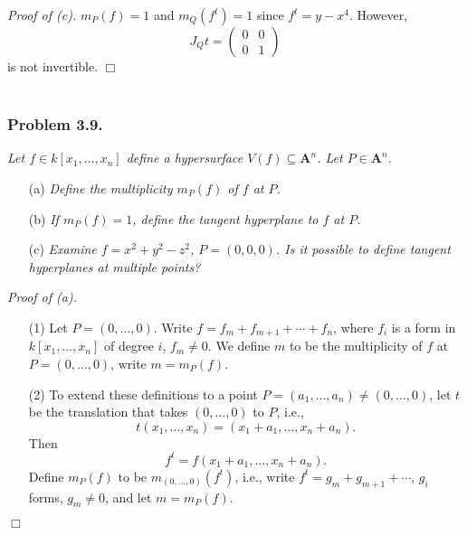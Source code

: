 \documentclass{article}
\begin{document}
\emph{Proof of (c).}
  $m_P(f) = 1$ and $m_Q(f^t) = 1$ since $f^t = y - x^4$.
  However,
  \[
    J_Q{t}
    =
    \begin{pmatrix}
      0 & 0 \\
      0 & 1
    \end{pmatrix}
  \]
  is not invertible.
$\Box$ \\\\






\subsubsection*{Problem 3.9.}
\emph{Let $f \in k[x_1,\ldots,x_n]$ define a hypersurface $V(f) \subseteq \mathbf{A}^{n}$.
Let $P \in \mathbf{A}^{n}$.}
\begin{enumerate}
\item[(a)]
  \emph{Define the multiplicity $m_P(f)$ of $f$ at $P$.}

\item[(b)]
  \emph{If $m_P(f) = 1$, define the tangent hyperplane to $f$ at $P$.}

\item[(c)]
  \emph{Examine $f = x^2 + y^2 - z^2$, $P = (0,0,0)$.
  Is it possible to define tangent hyperplanes at multiple points?} \\
\end{enumerate}



\emph{Proof of (a).}
\begin{enumerate}
\item[(1)]
  Let $P = (0,\ldots,0)$.
  Write $f = f_m + f_{m+1} + \cdots + f_n$,
  where $f_i$ is a form in $k[x_1,\ldots,x_n]$ of degree $i$, $f_m \neq 0$.
  We define $m$ to be the multiplicity of $f$ at $P = (0,\ldots,0)$, write $m = m_P(f)$.

\item[(2)]
  To extend these definitions to a point $P = (a_1,\ldots,a_n) \neq (0,\ldots,0)$,
  let $t$ be the translation that takes $(0,\ldots,0)$ to $P$, i.e.,
  \[
    t(x_1,\ldots,x_n) = (x_1+a_1,\ldots,x_n+a_n).
  \]
  Then
  \[
    f^{t} = f(x_1+a_1,\ldots,x_n+a_n).
  \]
  Define $m_P(f)$ to be $m_{(0,\ldots,0)}(f^t)$, i.e., write
  $f^t = g_m + g_{m+1} + \cdots$, $g_i$ forms, $g_m \neq 0$,
  and let $m = m_P(f)$.
\end{enumerate}
$\Box$ \\
\end{document}

